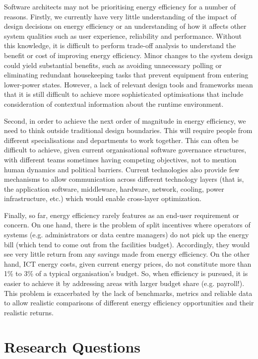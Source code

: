Software architects may not be prioritising energy efficiency for a number of reasons. Firstly, we currently have very little understanding of the impact of design decisions on energy efficiency or an understanding of how it affects other system qualities such as user experience, reliability and performance.  Without this knowledge, it is difficult to perform trade-off analysis to understand the benefit or cost of improving energy efficiency. Minor changes to the system design could yield substantial benefits, such as avoiding unnecessary polling or eliminating redundant housekeeping tasks that prevent equipment from entering lower-power states. However, a lack of relevant design tools and frameworks mean that it is still difficult to achieve more sophisticated optimisations that include consideration of contextual information about the runtime environment. 

Second, in order to achieve the next order of magnitude in energy efficiency, we need to think outside traditional design boundaries. This will require people from different specialisations and departments to work together. This can often be difficult to achieve, given current organisational software governance structures, with different teams sometimes having competing objectives, not to mention human dynamics and political barriers. Current technologies also provide few mechanisms to allow communication across different technology layers (that is, the application software, middleware, hardware, network, cooling, power infrastructure, etc.) which would enable cross-layer optimization.

Finally, so far, energy efficiency rarely features as an end-user requirement or concern. On one hand, there is the problem of split incentives where operators of systems (e.g. administrators or data centre managers) do not pick up the energy bill (which tend to come out from the facilities budget). Accordingly, they would see very little return from any savings made from energy efficiency. On the other hand, ICT energy costs, given current energy prices, do not constitute more than 1\% to 3\% of a typical organisation’s budget. So, when efficiency is pursued, it is easier to achieve it by addressing areas with larger budget share (e.g. payroll!). This problem is exacerbated by the lack of benchmarks, metrics and reliable data to allow realistic comparisons of different energy efficiency opportunities and their realistic returns.

\section{Research Questions}

